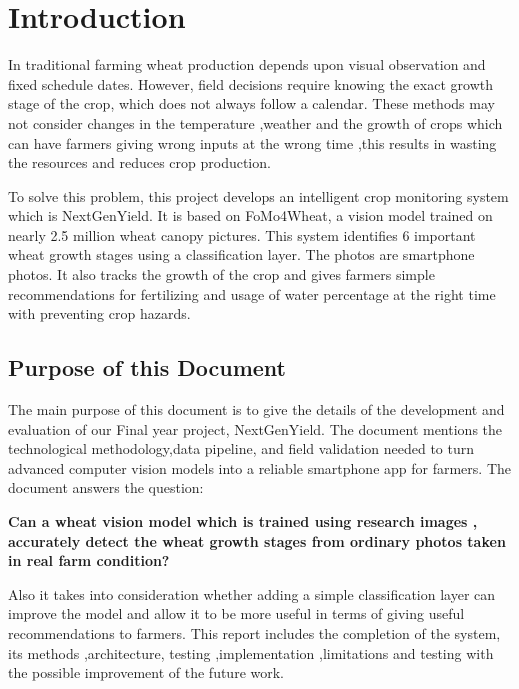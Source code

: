 \documentclass{FastFyp}
\begin{document}
\pagestyle{fancy} %
\tableofcontents

\pagebreak
\listoffigures	%
\pagebreak
\listoftables %

\mainmatter


\chapter{Introduction}
In traditional farming wheat production depends upon visual observation and fixed schedule dates. However, field decisions require knowing the exact growth stage of the crop, which does not always follow a calendar. These methods may not consider changes in the temperature ,weather and the growth of crops which can have farmers giving wrong inputs at the wrong time ,this results in wasting the resources and reduces crop production.

To solve this problem, this project develops an intelligent crop monitoring system which is NextGenYield. It is based on FoMo4Wheat, a vision model trained on nearly 2.5 million wheat canopy pictures. This system identifies 6 important wheat growth stages using a classification layer. The photos are smartphone photos. It also tracks the growth of the crop and gives farmers simple recommendations for fertilizing and usage of water percentage at the right time with preventing crop hazards.

 
\section{Purpose of this Document}

The main purpose of this document is to give the details of the development and evaluation of our Final year project, NextGenYield. The document mentions the technological methodology,data pipeline, and field validation needed to turn advanced computer vision models into a reliable smartphone app for farmers. The document answers the question: 

\textbf{Can a wheat vision model which is trained using research images , accurately detect the wheat growth stages from ordinary photos taken in real farm condition?}

Also it takes into consideration whether adding a simple classification layer can improve the model and allow it to be more useful in terms of giving useful recommendations to farmers. This report includes the completion of the system, its methods ,architecture, testing ,implementation ,limitations and testing with the possible improvement of the future work.
\end{document}
